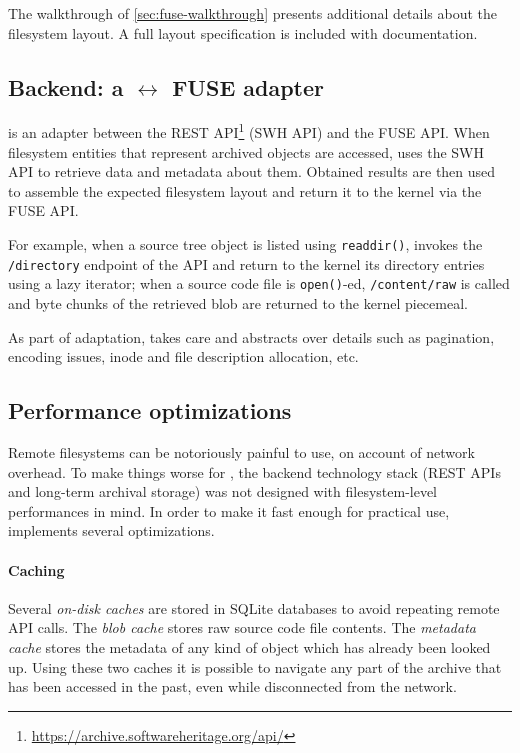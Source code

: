 The walkthrough of \cref{sec:fuse-walkthrough} presents additional details
about the \SWHFS{} filesystem layout. A full layout specification is included
with \SWHFS{} documentation.


\subsection{Backend: a \SWH{} $\leftrightarrow$ FUSE adapter}

\SWHFSpy{} is an adapter between the \SWH{} REST
API\footnote{\url{https://archive.softwareheritage.org/api/}} (SWH API) and the
FUSE API\@. When filesystem entities that represent archived objects are
accessed, \SWHFSpy{} uses the SWH API to retrieve data and metadata about them.
Obtained results are then used to assemble the expected filesystem layout and
return it to the kernel via the FUSE API\@.

For example, when a source tree object is listed using
\texttt{readdir()}, \SWHFS{} invokes the \texttt{/directory} endpoint of
the \SWH{} API and return to the kernel its directory entries using a lazy
iterator; when a source code file is \texttt{open()}-ed,
\texttt{/content/raw} is called and byte chunks of the retrieved blob are
returned to the kernel piecemeal.

As part of adaptation, \SWHFSpy{} takes care and abstracts over details such as
pagination, encoding issues, inode and file description allocation, etc.


\subsection{Performance optimizations}

Remote filesystems can be notoriously painful to use, on account of network
overhead.  To make things worse for \SWHFS, the backend technology stack (REST
APIs and long-term archival storage) was not designed with filesystem-level
performances in mind. In order to make it fast enough for practical use,
\SWHFS{} implements several optimizations.


\paragraph*{Caching}

Several \emph{on-disk caches} are stored in SQLite databases to avoid repeating
remote API calls.
The \emph{blob cache} stores raw source code file contents. The \emph{metadata
  cache} stores the metadata of any kind of object which has already been
  looked up. Using these two caches it is possible to navigate any part of the
  \SWH{} archive that has been accessed in the past, even while disconnected
  from the network.

